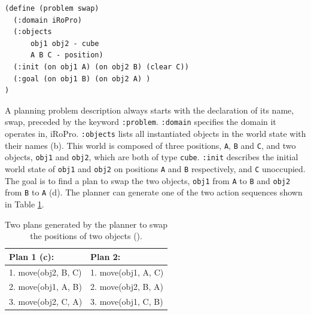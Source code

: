 \begin{verbatim}
(define (problem swap)
  (:domain iRoPro)
  (:objects 
      obj1 obj2 - cube
      A B C - position)
  (:init (on obj1 A) (on obj2 B) (clear C))
  (:goal (on obj1 B) (on obj2 A) )
)
\end{verbatim}

A planning problem description always starts with the declaration of its name, \eg swap, preceded by the keyword \texttt{:problem}.
\texttt{:domain} specifies the domain it operates in, \eg iRoPro.
\texttt{:objects} lists all instantiated objects in the world state with their names (b). 
This world is composed of three positions, \texttt{A}, \texttt{B} and \texttt{C}, and two objects, \texttt{obj1} and \texttt{obj2}, which are both of type \texttt{cube}. 
\texttt{:init} describes the initial world state of \texttt{obj1} and \texttt{obj2} on positions \texttt{A} and \texttt{B} respectively, and \texttt{C} unoccupied.
The goal is to find a plan to swap the two objects, \ie \texttt{obj1} from \texttt{A} to \texttt{B} and \texttt{obj2} from \texttt{B} to \texttt{A} (d). 
The planner can generate one of the two action sequences shown in Table \ref{tab:swapsolutions}.
\begin{table}[!h]
	\caption{Two plans generated by the planner to swap the positions of two objects ().}
	\begin{center}
		\begin{tabular}{l|l} 
			Plan 1 (\fig{fig:planning problem}c): & Plan 2:\\ \hline
			1. move(obj2, B, C) &
			1. move(obj1, A, C)\\
			2. move(obj1, A, B)&
			2. move(obj2, B, A)\\
			3. move(obj2, C, A)&
			3. move(obj1, C, B)\\
		\end{tabular}
	\end{center}
\label{tab:swapsolutions}
\end{table}
